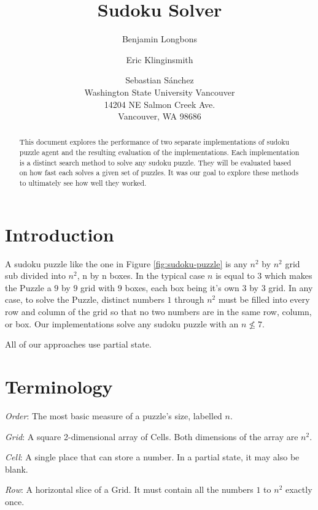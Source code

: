 \documentclass[letterpaper]{article}
\begin{document}
\title{Sudoku Solver}
\author{
	Benjamin Longbons\and
    Eric Klinginsmith \and
    Sebastian S\'{a}nchez \\
Washington State University Vancouver \\
14204 NE Salmon Creek Ave. \\
Vancouver, WA 98686
}

\maketitle
\begin{abstract}
This document explores the performance of two separate implementations of sudoku puzzle agent and the resulting evaluation of the implementations. Each implementation is a distinct search method to solve any sudoku puzzle. They will be evaluated based on how fast each solves a given set of puzzles. It was our goal to explore these methods to ultimately see how well they worked.
\end{abstract}

\section{Introduction}

A sudoku puzzle like the one in Figure \ref{fig:sudoku-puzzle} is any $ n^{2} $ by $ n^{2} $ grid sub divided into $ n^{2} $, n by n boxes. In the typical case $ n $ is equal to $3$ which makes the Puzzle a $9$ by $9$ grid with $9$ boxes, each box being it's own $3$ by $3$ grid. In any case, to solve the Puzzle, distinct numbers $1$ through $ n^{2} $ must be filled into every row and column of the grid so that no two numbers are in the same row, column, or box. Our implementations solve any sudoku puzzle with an $n \not\le 7$.

All of our approaches use partial state.

\section{Terminology}

\emph{Order}: The most basic measure of a puzzle's size, labelled $ n $.

\emph{Grid}: A square 2-dimensional array of Cells. Both dimensions
of the array are $ n^2 $.

\emph{Cell}: A single place that can store a number. In a partial state,
it may also be blank.

\emph{Row}: A horizontal slice of a Grid. It must contain all the
numbers $ 1 $ to $ n^2 $ exactly once.
\end{document}
